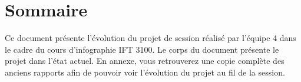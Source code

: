 \chapter*{Sommaire}
\label{s:sommaire}

Ce document présente l'évolution du projet de session réalisé par l'équipe 4 dans le cadre du cours d'infographie IFT 3100. Le corps du document présente le projet dans l'état actuel. En annexe, vous retrouverez une copie complète des anciens rapports afin de pouvoir voir l'évolution du projet au fil de la session.